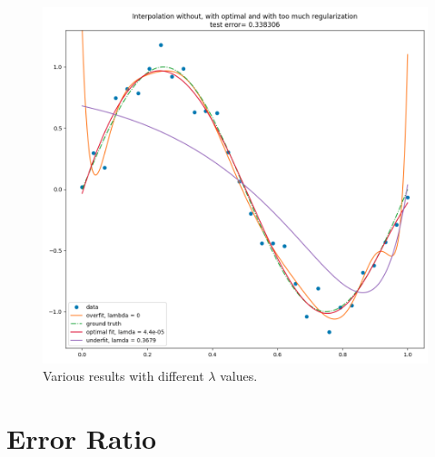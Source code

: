 \documentclass{article}
\begin{document}
	
	
	
	
	
	
	\begin{figure}[h]
		\centering
		\includegraphics[width=\linewidth]{plots/full4cropped.png}
		\caption{Various results with different $\lambda$ values. }
		\label{plot:full4cropped}
	\end{figure}
	
	
	\newpage
	\section{Error Ratio}
	
\end{document}
